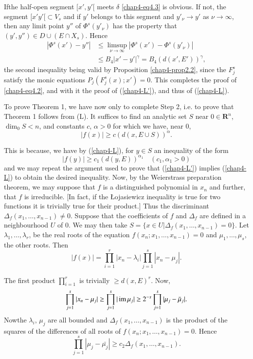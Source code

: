 If\pageoriginale the half-open segment $[x',y'[$ meets $\delta $ \eqref{chap4-eq4.3} is obvious. If not, the segment $[x' y'[ \subset V_s$ and if $y'$ belongs to this segment and $y'_{\nu} \to y'$ as $\nu \to \infty$, then any limit point $y''$ of $\Phi^s (y'_\nu)$ has the property that $(y', y'') \in D \cup (E \cap X_s)$. Hence
\begin{align*}
  |\Phi^s (x') - y''| & \leq  {\displaystyle\mathop{\lim\sup}_{\nu \to \infty}} |\Phi^s (x') - \Phi^s (y'_\nu)|\\
  & \leq B_4 |x' - y'|^\gamma = B_4 (d (x', E'))^\gamma,
\end{align*}
the  second inequality being valid by Proposition \ref{chap4-prop2.2}, since the $F^s_j$ satisfy the monic equations $P_j (F^s_j (x); x' ) =0$. This completes the proof of \eqref{chap4-eq4.2}, and with it the proof of (\ref{chap4-L'}), and thus of (\ref{chap4-L}).

To prove Theorem 1, we have now only to complete Step 2, i.e. to prove that Theorem 1 follows from (L). It suffices to find an analytic set $S$ near $0 \in \mathbf{R}^n$, $\dim_0 S < n$, and constants $c$, $\alpha >0$ for which we have, near 0,
$$
|f(x)| \geq c (d (x, E \cup S))^\alpha.
$$

This is because, we have by (\ref{chap4-L}), for $y \in S$ an inequality of the form
$$
|f(y)| \geq c_1 (d(y, E))^{\alpha_1} \quad (c_1, \alpha_1 > 0)
$$
and we may repeat the argument used to prove that (\ref{chap4-L'}) implies (\ref{chap4-L}) to obtain the desired inequality. Now, by the Weierstrass preparation theorem, we may suppose that $f$ is a distinguished polynomial in $x_n$ and further, that $f$ is irreducible. [In fact, if the \L ojasiewicz inequality is true for two functions it is trivially true for their product.] Thus the discriminant $\Delta_f (x_1, \ldots, x_{n-1}) \neq 0$. Suppose that the coefficients of $f$ and $\Delta_f$ are defined in a neighbourhood $U$ of 0. We may then take $S = \{x \in U | \Delta_f (x_1, \ldots, x_{n-1}) = 0\}$. Let $\lambda_1, \ldots, \lambda_r$, be the real roots of the equation $f(x_n ; x_1, \ldots, x_{n-1}) =0$ and $\mu_1, \ldots, \mu_s$, the other roots. Then
$$
|f(x)| = \prod\limits^r_{i=1} |x_n - \lambda_i| \prod\limits^s_{j=1} |x_n - \mu_j|.
$$

The first product $\prod\limits^r_{i=1}$ is trivially $\geq d (x, E)^r$. Now,
$$
\prod\limits^s_{j=1} |x_n - \mu_j| \geq \prod\limits^s_{j=1} |\operatorname{im} \mu_j| \geq 2^{-s} \prod\limits^s_{j=1} |\mu_j - \bar{\mu}_j|.
$$
Now\pageoriginale the $\lambda_i$, $\mu_j$ are all bounded and $\Delta_f (x_1, \ldots, x_{n-1})$ is the product of the squares of the differences of all roots of $f(x_n; x_1, \ldots, x_{n-1}) =0$.
Hence
$$
\prod\limits^s_{j=1} |\mu_j - \bar{\mu_j}| \geq c_2 \Delta_f (x_1, \ldots, x_{n-1}).
$$

